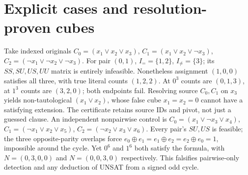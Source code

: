 \documentclass[10pt]{article}
\begin{document}
\section{Explicit cases and resolution-proven cubes}
Take indexed originals \(C_0=(x_1\vee x_2\vee x_3)\), \(C_1=(x_1\vee x_2\vee\neg x_3)\), \(C_2=(\neg x_1\vee\neg x_2\vee\neg x_3)\).
For pair \((0,1)\), \(I_==\{1,2\}\), \(I_{\ne}=\{3\}\); its \(SS,SU,US,UU\) matrix is entirely infeasible. Nonetheless assignment \((1,0,0)\) satisfies all three, with true literal counts \((1,2,2)\). At \(0^3\) counts are \((0,1,3)\), at \(1^3\) counts are \((3,2,0)\); both endpoints fail. Resolving source \(C_0,C_1\) on \(x_3\) yields non-tautological \((x_1\vee x_2)\), whose false cube \(x_1=x_2=0\) cannot have a satisfying extension. The certificate retains source IDs and pivot, not just a guessed clause.
An independent nonpairwise control is \(C_0=(x_1\vee\neg x_3\vee x_4)\), \(C_1=(\neg x_1\vee x_2\vee x_5)\), \(C_2=(\neg x_2\vee x_3\vee x_6)\). Every pair's \(SU,US\) is feasible; the three opposite-parity overlaps force \(e_0\oplus e_1=e_1\oplus e_2=e_2\oplus e_0=1\), impossible around the cycle. Yet \(0^6\) and \(1^6\) both satisfy the formula, with \(N=(0,3,0,0)\) and \(N=(0,0,3,0)\) respectively. This falsifies pairwise-only detection and any deduction of UNSAT from a signed odd cycle.
\end{document}
